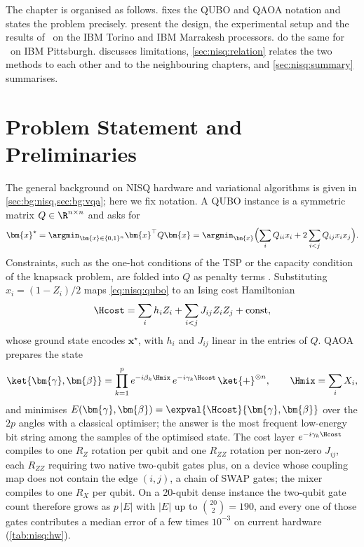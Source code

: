 The chapter is organised as follows.  fixes the QUBO and QAOA notation and states the problem precisely.  present the design, the experimental setup and the results of \deal\ on the IBM Torino and IBM Marrakesh processors.  do the same for \qawa\ on IBM Pittsburgh.  discusses limitations, \cref{sec:nisq:relation} relates the two methods to each other and to the neighbouring chapters, and \cref{sec:nisq:summary} summarises.

\section{Problem Statement and Preliminaries}\label{sec:nisq:problem}

The general background on NISQ hardware and variational algorithms is given in \cref{sec:bg:nisq,sec:bg:vqa}; here we fix notation. A QUBO instance is a symmetric matrix $Q\in\R^{n\times n}$ and asks for
\begin{equation}\label{eq:nisq:qubo}
  \bm{x}^{\star} = \argmin_{\bm{x}\in\{0,1\}^{n}} \bm{x}^{\top} Q \bm{x}
  = \argmin_{\bm{x}} \Bigl(\sum_{i} Q_{ii}x_{i} + 2\sum_{i<j} Q_{ij}x_{i}x_{j}\Bigr).
\end{equation}
Constraints, such as the one-hot conditions of the TSP or the capacity condition of the knapsack problem, are folded into $Q$ as penalty terms \cite{glover2018qubo,montanezbarrera2024unbalanced}. Substituting $x_{i}=(1-Z_{i})/2$ maps \cref{eq:nisq:qubo} to an Ising cost Hamiltonian
\begin{equation}\label{eq:nisq:ising}
  \Hcost = \sum_{i} h_{i} Z_{i} + \sum_{i<j} J_{ij} Z_{i}Z_{j} + \text{const},
\end{equation}
whose ground state encodes $\bm{x}^{\star}$, with $h_{i}$ and $J_{ij}$ linear in the entries of $Q$. QAOA prepares the state
\begin{equation}\label{eq:nisq:qaoa}
  \ket{\bm{\gamma},\bm{\beta}} = \prod_{k=1}^{p} e^{-i\beta_{k}\Hmix}\, e^{-i\gamma_{k}\Hcost}\, \ket{+}^{\otimes n},
  \qquad \Hmix = \sum_{i} X_{i},
\end{equation}
and minimises $E(\bm{\gamma},\bm{\beta})=\expval{\Hcost}{\bm{\gamma},\bm{\beta}}$ over the $2p$ angles with a classical optimiser; the answer is the most frequent low-energy bit string among the samples of the optimised state. The cost layer $e^{-i\gamma_{k}\Hcost}$ compiles to one $R_{Z}$ rotation per qubit and one $R_{ZZ}$ rotation per non-zero $J_{ij}$, each $R_{ZZ}$ requiring two native two-qubit gates plus, on a device whose coupling map does not contain the edge $(i,j)$, a chain of SWAP gates; the mixer compiles to one $R_{X}$ per qubit. On a 20-qubit dense instance the two-qubit gate count therefore grows as $p\,|E|$ with $|E|$ up to $\binom{20}{2}=190$, and every one of those gates contributes a median error of a few times $10^{-3}$ on current hardware (\cref{tab:nisq:hw}).

